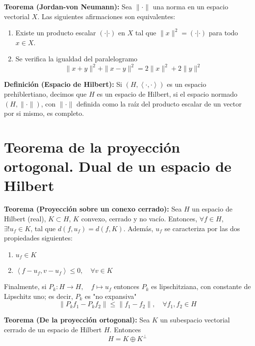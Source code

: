\documentclass{article}
\begin{document}
\textbf{Teorema (Jordan-von Neumann):} Sea $\|\cdot\|$ una norma en un espacio vectorial $X$. Las siguientes afirmaciones son equivalentes:
\begin{enumerate}
\item Existe un producto escalar $(\cdot|\cdot)$ en $X$ tal que $\|x\|^2=(\cdot|\cdot)$ para todo $x\in X$.

\item Se verifica la igualdad del paralelogramo
\begin{equation*}
\|x+y\|^2+\|x-y\|^2=2\|x\|^2+2\|y\|^2
\end{equation*}
\end{enumerate}

\textbf{Definición (Espacio de Hilbert):} Si $(H,\left\langle\cdot,\cdot\right\rangle)$ es un espacio prehiblertiano, decimos que $H$ es un espacio de Hilbert, si el espacio normado $(H,\|\cdot\|)$, con $\|\cdot\|$ definida como la raíz del producto escalar de un vector por si mismo, es completo.

\section{Teorema de la proyección ortogonal. Dual de un espacio de Hilbert}
\textbf{Teorema (Proyección sobre un conexo cerrado):} Sea $H$ un espacio de Hilbert (real), $K\subset H$, $K$ convexo, cerrado y no vacío. Entonces, $\forall f\in H$, $\exists! u_f\in K$, tal que $d(f,u_f)=d(f,K)$. Además, $u_f$ se caracteriza por las dos propiedades siguientes:
\begin{enumerate}
\item $u_f\in K$

\item $\left\langle f-u_f,v-u_f\right\rangle \leq 0,\quad \forall v\in K$
\end{enumerate}

Finalmente, si $P_k:H\rightarrow H,\quad f\mapsto u_f$ entonces $P_k$ es lipschitziana, con constante de Lipschitz uno; es decir, $P_k$ es "no expansiva"
\begin{equation*}
\|P_kf_1-P_kf_2\|\leq \|f_1-f_2\|,\quad \forall f_1,f_2\in H
\end{equation*}

\textbf{Teorema (De la proyección ortogonal):} Sea $K$ un subespacio vectorial cerrado de un espacio de Hilbert $H$. Entonces
\begin{equation*}
H=K\oplus K^\bot
\end{equation*}
\end{document}
